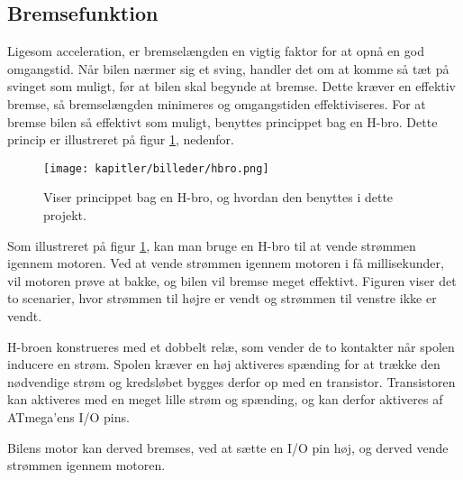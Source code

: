 \newpage
\subsection{Bremsefunktion}
Ligesom acceleration, er bremselængden en vigtig faktor for at opnå en god omgangstid.
Når bilen nærmer sig et sving, handler det om at komme så tæt på svinget som muligt, før at bilen
skal begynde at bremse. Dette kræver en effektiv bremse, så bremselængden minimeres og omgangstiden effektiviseres.
For at bremse bilen så effektivt som muligt, benyttes princippet bag en H-bro. Dette princip er illustreret
på figur \ref{fig:hbro}, nedenfor.

\begin{figure}[ht]
    \centering
    \texttt{[image: kapitler/billeder/hbro.png]}
    \caption{Viser princippet bag en H-bro, og hvordan den benyttes i dette projekt.}
    \label{fig:hbro}
\end{figure}

Som illustreret på figur \ref{fig:hbro}, kan man bruge en H-bro til at vende strømmen igennem motoren.
Ved at vende strømmen igennem motoren i få millisekunder, vil motoren prøve at bakke,
og bilen vil bremse meget effektivt. Figuren viser det to scenarier, hvor strømmen til højre er vendt
og strømmen til venstre ikke er vendt.

H-broen konstrueres med et dobbelt relæ, som vender de to kontakter når spolen inducere en strøm.
Spolen kræver en høj aktiveres spænding for at trække den nødvendige strøm
og kredsløbet bygges derfor op med en transistor.
Transistoren kan aktiveres med en meget lille strøm og spænding, og kan derfor aktiveres
af ATmega'ens I/O pins.

Bilens motor kan derved bremses, ved at sætte en I/O pin høj, og derved vende strømmen igennem motoren.
